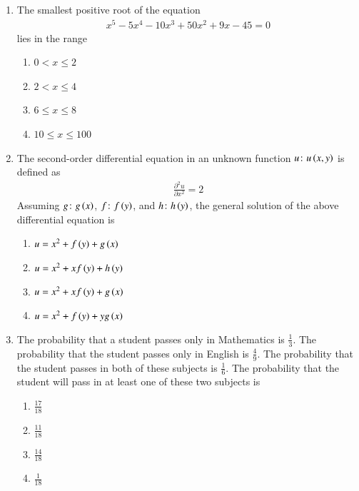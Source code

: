 \documentclass[journal,12pt,onecolumn]{article}
\theoremstyle{remark}
\begin{document}
\begin{enumerate}
    \item The smallest positive root of the equation
    \begin{align}
    x^5 - 5x^4 - 10x^3 + 50x^2 + 9x - 45 = 0
    \end{align}
    lies in the range

    \hfill{}
    \begin{enumerate}
        \item $0 < x \le 2$
        \item $2 < x \le 4$
        \item $6 \le x \le 8$
        \item $10 \le x \le 100$
    \end{enumerate}

    \item The second-order differential equation in an unknown function $u\colon u\left(x, y\right)$ is defined as
    \begin{align}
    \frac{\partial^2 u}{\partial x^2} = 2
    \end{align}
    Assuming $g\colon g\left(x\right)$, $f\colon f\left(y\right)$, and $h\colon h\left(y\right)$, the general solution of the above differential equation is

    \hfill{}
    \begin{enumerate}
        \item $u = x^2 + f\left(y\right) + g\left(x\right)$
        \item $u = x^2 + x f\left(y\right) + h\left(y\right)$
        \item $u = x^2 + x f\left(y\right) + g\left(x\right)$
        \item $u = x^2 + f\left(y\right) + y g\left(x\right)$
    \end{enumerate}

    \item The probability that a student passes only in Mathematics is $\frac{1}{3}$. The probability that the student passes only in English is $\frac{4}{9}$. The probability that the student passes in both of these subjects is $\frac{1}{6}$. The probability that the student will pass in at least one of these two subjects is

    \hfill{}
    \begin{enumerate}
        \item $\frac{17}{18}$
        \item $\frac{11}{18}$
        \item $\frac{14}{18}$
        \item $\frac{1}{18}$
    \end{enumerate}


\end{enumerate}
\end{document}
